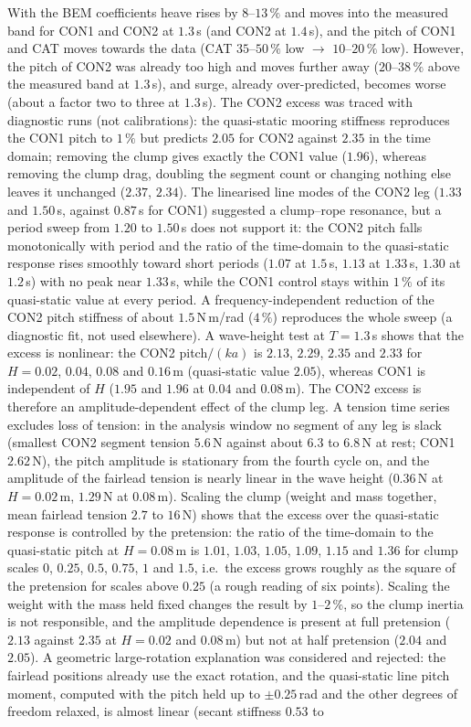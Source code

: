\documentclass[11pt,a4paper]{article}
\begin{document}
With the BEM coefficients heave rises by $8$--$13\,\%$ and moves into the measured band for CON1 and CON2 at $1.3$\,s (and CON2 at $1.4$\,s), and the pitch of CON1 and CAT moves towards the data (CAT $35$--$50\,\%$ low $\to$ $10$--$20\,\%$ low). However, the pitch of CON2 was already too high and moves further away ($20$--$38\,\%$ above the measured band at $1.3$\,s), and surge, already over-predicted, becomes worse (about a factor two to three at $1.3$\,s). The CON2 excess was traced with diagnostic runs (not calibrations): the quasi-static mooring stiffness reproduces the CON1 pitch to $1\,\%$ but predicts $2.05$ for CON2 against $2.35$ in the time domain; removing the clump gives exactly the CON1 value ($1.96$), whereas removing the clump drag, doubling the segment count or changing nothing else leaves it unchanged ($2.37$, $2.34$). The linearised line modes of the CON2 leg ($1.33$ and $1.50$\,s, against $0.87$\,s for CON1) suggested a clump--rope resonance, but a period sweep from $1.20$ to $1.50$\,s does not support it: the CON2 pitch falls monotonically with period and the ratio of the time-domain to the quasi-static response rises smoothly toward short periods ($1.07$ at $1.5$\,s, $1.13$ at $1.33$\,s, $1.30$ at $1.2$\,s) with no peak near $1.33$\,s, while the CON1 control stays within $1\,\%$ of its quasi-static value at every period. A frequency-independent reduction of the CON2 pitch stiffness of about $1.5$\,N\,m/rad ($4\,\%$) reproduces the whole sweep (a diagnostic fit, not used elsewhere). A wave-height test at $T=1.3$\,s shows that the excess is nonlinear: the CON2 pitch$/(ka)$ is $2.13$, $2.29$, $2.35$ and $2.33$ for $H=0.02$, $0.04$, $0.08$ and $0.16$\,m (quasi-static value $2.05$), whereas CON1 is independent of $H$ ($1.95$ and $1.96$ at $0.04$ and $0.08$\,m). The CON2 excess is therefore an amplitude-dependent effect of the clump leg. A tension time series excludes loss of tension: in the analysis window no segment of any leg is slack (smallest CON2 segment tension $5.6$\,N against about $6.3$ to $6.8$\,N at rest; CON1 $2.62$\,N), the pitch amplitude is stationary from the fourth cycle on, and the amplitude of the fairlead tension is nearly linear in the wave height ($0.36$\,N at $H=0.02$\,m, $1.29$\,N at $0.08$\,m). Scaling the clump (weight and mass together, mean fairlead tension $2.7$ to $16$\,N) shows that the excess over the quasi-static response is controlled by the pretension: the ratio of the time-domain to the quasi-static pitch at $H=0.08$\,m is $1.01$, $1.03$, $1.05$, $1.09$, $1.15$ and $1.36$ for clump scales $0$, $0.25$, $0.5$, $0.75$, $1$ and $1.5$, i.e.\ the excess grows roughly as the square of the pretension for scales above $0.25$ (a rough reading of six points). Scaling the weight with the mass held fixed changes the result by $1$--$2\,\%$, so the clump inertia is not responsible, and the amplitude dependence is present at full pretension ($2.13$ against $2.35$ at $H=0.02$ and $0.08$\,m) but not at half pretension ($2.04$ and $2.05$). A geometric large-rotation explanation was considered and rejected: the fairlead positions already use the exact rotation, and the quasi-static line pitch moment, computed with the pitch held up to $\pm0.25$\,rad and the other degrees of freedom relaxed, is almost linear (secant stiffness $0.53$ to 
\end{document}
